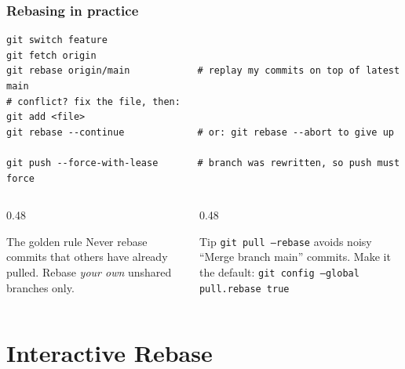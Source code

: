 \documentclass[aspectratio=169,10pt,compress]{beamer}
\newcommand{\cmd}[1]{\texttt{\color{gitred}#1}}
\begin{document}
\begin{frame}[t,fragile] \frametitle{Rebasing in practice}
\begin{lstlisting}
git switch feature
git fetch origin
git rebase origin/main            # replay my commits on top of latest main
# conflict? fix the file, then:
git add <file>
git rebase --continue             # or: git rebase --abort to give up

git push --force-with-lease       # branch was rewritten, so push must force
\end{lstlisting}

  \begin{columns}[T]
    \begin{column}{0.48\textwidth}
      \begin{alertblock}{The golden rule}
        Never rebase commits that others have already pulled.
        Rebase \emph{your own} unshared branches only.
      \end{alertblock}
    \end{column}
    \begin{column}{0.48\textwidth}
      \begin{block}{Tip}
        \cmd{git pull --rebase} avoids noisy ``Merge branch main'' commits.
        Make it the default: \cmd{git config --global pull.rebase true}
      \end{block}
    \end{column}
  \end{columns}
\end{frame}

\section[Rebase -i]{Interactive Rebase}
\end{document}
